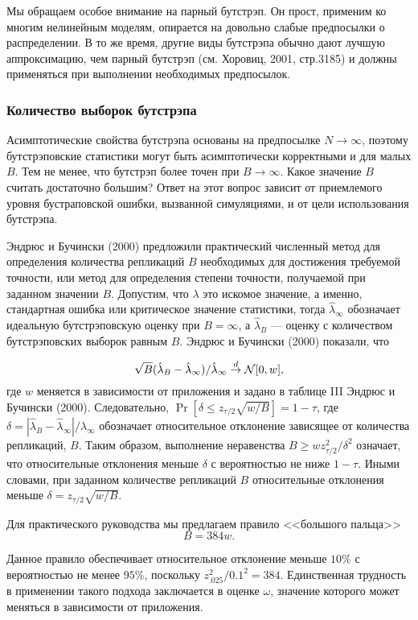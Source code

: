 Мы обращаем особое внимание на парный бутстрэп. Он прост, применим ко многим нелинейным моделям, опирается на довольно слабые предпосылки о распределении.  В то же время, другие виды бутстрэпа обычно дают лучшую аппроксимацию, чем парный бутстрэп (см. Хоровиц, 2001, стр.3185) и должны применяться при выполнении необходимых предпосылок.

\subsubsection*{Количество выборок бутстрэпа}

Асимптотические свойства бутстрэпа основаны на предпосылке $N \rightarrow \infty$, поэтому бутстрэповские статистики могут быть асимптотически корректными и для малых $B$. Тем не менее, что бутстрэп более точен при $B \rightarrow \infty$. Какое значение $B$ считать достаточно большим? Ответ на этот вопрос зависит от приемлемого уровня бустраповской ошибки, вызванной симуляциями, и от цели использования бутстрэпа.

Эндрюс и Бучински (2000) предложили практический численный метод для определения количества репликаций $B$ необходимых для достижения требуемой точности, или метод для определения степени точности, получаемой при заданном значении $B$. Допустим, что $\lambda$ это искомое значение, а именно, стандартная ошибка или критическое значение статистики, тогда $\hat{\lambda}_\infty$ обозначает идеальную бутстрэповскую оценку при $B=\infty$, а $\hat{\lambda}_B$ --- оценку с количеством бутстрэповских выборок равным $B$. Эндрюс и Бучински (2000) показали, что

\[
\sqrt{B}(\hat{\lambda}_B-\hat{\lambda}_{\infty})/\hat{\lambda}_{\infty} \stackrel{d}{\rightarrow} \mathcal{N}[0,w],
\]
где $w$ меняется в зависимости от приложения и задано в таблице III Эндрюс и Бучински (2000). Следовательно, $\Pr[\delta \leq z_{\tau/2} \sqrt{w/B}]=1-\tau$, где $\delta=|\hat{\lambda}_B-\hat{\lambda}_{\infty}|/\hat{\lambda}_{\infty}$ обозначает относительное отклонение зависящее от количества репликаций, $B$. Таким образом, выполнение неравенства $B \geq wz_{\tau/2}^2 / \delta^2$ означает, что относительные отклонения меньше $\delta$ с вероятностью не ниже $1-\tau$. Иными словами, при заданном количестве репликаций $B$ относительные отклонения меньше $\delta=z_{\tau/2}\sqrt{w/B}$.

Для практического руководства мы предлагаем правило <<большого пальца>>
\[
B=384w.
\]

Данное правило обеспечивает относительное отклонение меньше $10\%$ с вероятностью не менее $95\%$, поскольку $z_{.025}^2/0.1^2=384$. Единственная трудность в применении такого подхода заключается в оценке $\omega$, значение которого может меняться в зависимости от приложения.

